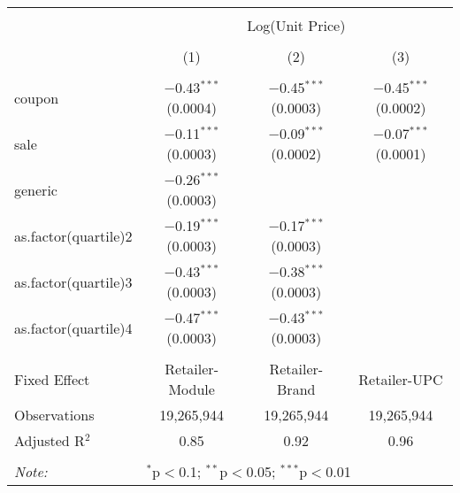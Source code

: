 
\begin{table}[!htbp] \centering 
  \caption{} 
  \label{tab:overallSavingsNonStorable} 
\begin{tabular}{@{\extracolsep{5pt}}lccc} 
\\[-1.8ex]\hline 
\hline \\[-1.8ex] 
 & \multicolumn{3}{c}{Log(Unit Price)} \\ 
\\[-1.8ex] & (1) & (2) & (3)\\ 
\hline \\[-1.8ex] 
 coupon & $-$0.43$^{***}$ (0.0004) & $-$0.45$^{***}$ (0.0003) & $-$0.45$^{***}$ (0.0002) \\ 
  sale & $-$0.11$^{***}$ (0.0003) & $-$0.09$^{***}$ (0.0002) & $-$0.07$^{***}$ (0.0001) \\ 
  generic & $-$0.26$^{***}$ (0.0003) &  &  \\ 
  as.factor(quartile)2 & $-$0.19$^{***}$ (0.0003) & $-$0.17$^{***}$ (0.0003) &  \\ 
  as.factor(quartile)3 & $-$0.43$^{***}$ (0.0003) & $-$0.38$^{***}$ (0.0003) &  \\ 
  as.factor(quartile)4 & $-$0.47$^{***}$ (0.0003) & $-$0.43$^{***}$ (0.0003) &  \\ 
 \hline \\[-1.8ex] 
Fixed Effect & Retailer-Module & Retailer-Brand & Retailer-UPC \\ 
Observations & 19,265,944 & 19,265,944 & 19,265,944 \\ 
Adjusted R$^{2}$ & 0.85 & 0.92 & 0.96 \\ 
\hline 
\hline \\[-1.8ex] 
\textit{Note:}  & \multicolumn{3}{l}{$^{*}$p$<$0.1; $^{**}$p$<$0.05; $^{***}$p$<$0.01} \\ 
\end{tabular} 
\end{table} 
